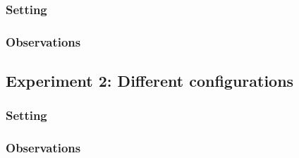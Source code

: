 \documentclass[11pt]{article}
\begin{document}
\subsubsection{Setting}

\subsubsection{Observations}

\subsection{Experiment 2: Different configurations}

\subsubsection{Setting}

\subsubsection{Observations}
\end{document}
